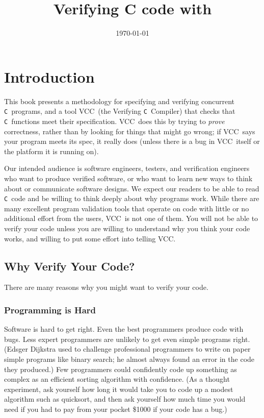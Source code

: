 \documentclass{report}
\title{Verifying C code with \VCC}
\date{\today}
\newcommand{\Q}[1]{\lstinline~#1~}
\newcommand{\C}{\Q{C}}
\newcommand{\VCC}{VCC}
\begin{document}
\lstset{language=c}
\lstset{commentstyle=\textit}
 
\maketitle

\chapter{Introduction}

This book presents a methodology for specifying and verifying
concurrent \C\ programs, and a tool \VCC\ (the Verifying \C\ Compiler)
that checks that \C\ functions meet their specification. \VCC\ does
this by trying to \emph{prove} correctness, rather than by looking for
things that might go wrong; if \VCC\ says your program meets its spec,
it really does (unless there is a bug in \VCC\ itself or the platform
it is running on).

Our intended audience is software engineers, testers, and verification
engineers who want to produce verified software, or who want to learn
new ways to think about or communicate software designs.  We expect
our readers to be able to read \C\ code and be willing to think deeply
about why programs work.  While there are many excellent program
validation tools that operate on code with little or no additional
effort from the users, \VCC\ is not one of them. You will not be able
to verify your code unless you are willing to understand why you think
your code works, and willing to put some effort into telling \VCC.

\section{Why Verify Your Code?}

There are many reasons why you might want to verify your code. 

\subsection{Programming is Hard}
Software is hard to get right. Even the best programmers produce code
with bugs. Less expert programmers are unlikely to get even simple
programs right. (Edsger Dijkstra used to challenge professional
programmers to write on paper simple programs like binary search; he
almost always found an error in the code they produced.)  Few
programmers could confidently code up something as complex as an
efficient sorting algorithm with confidence. (As a thought experiment,
ask yourself how long it would take you to code up a modest algorithm
such as quicksort, and then ask yourself how much time you would need if
you had to pay from your pocket \$1000 if your code has a bug.)
\end{document}
